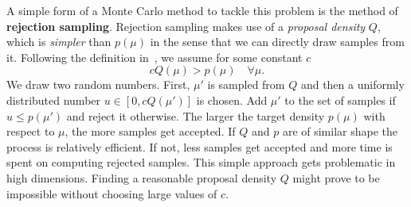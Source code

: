 A simple form of a Monte Carlo method to tackle this problem is the method of \textbf{rejection sampling}. 
Rejection sampling makes use of a \emph{proposal density} $Q$, which is \emph{simpler} than $p(\mu)$ in the sense that we can directly 
draw samples from it. Following the definition in~\cite{mackay_inference}, we assume for some constant $c$ 
\begin{equation*}
  c Q(\mu) > p(\mu)\quad \forall \mu.
\end{equation*}
We draw two random numbers. First, $\mu'$ is sampled from $Q$ and then a uniformly distributed number $u \in [0, cQ(\mu')]$ is chosen.
Add $\mu'$ to the set of samples if $u \leq p(\mu')$ and reject it otherwise. 
The larger the target density $p(\mu)$ with respect to $\mu$, the more samples get accepted. If $Q$ and $p$ are of similar shape the process is 
relatively efficient. If not, less samples get accepted and more time is spent on computing rejected samples. This simple approach
gets problematic in high dimensions. Finding a reasonable proposal density $Q$ might prove to be impossible without choosing large 
values of $c$. 

